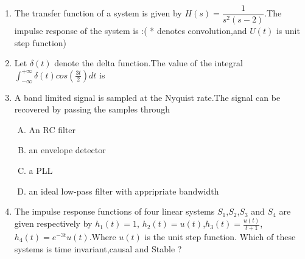 \documentclass[journal,12pt,twocolumn]{IEEEtran}
\begin{document}
\begin{enumerate}
\item The transfer function of a system is given by $H(s)=\dfrac{1}{s^{2}(s-2)}$.The impulse response of the system is :( * denotes convolution,and $U(t)$ is unit step function)

\begin{enumerate}[(A)]
\end{enumerate}


\item Let $\delta(t)$ denote the delta function.The value of the integral $\int_{-\infty}^{+\infty} \delta(t) cos(\frac{3t}{2}) dt$ is\\

\begin{enumerate}[(A)]
\end{enumerate}


\item A band limited signal is sampled at the Nyquist rate.The signal can be recovered by passing the samples through\\

\begin{enumerate}[(A)]

\setlength\itemsep{2em}

\item An RC filter
\item an envelope detector
\item a PLL
\item an ideal low-pass filter with appripriate bandwidth


\end{enumerate}

\item The impulse response functions of four linear systems $S_1$,$S_2$,$S_3$ and $S_4$ are given respectively by
\newline $h_1(t)=1$, $h_2(t)=u(t)$,$h_3(t)=\frac{u(t)}{t+1}$, $h_4(t)=e^{-3t}u(t)$.Where $u(t)$ is the unit step function. Which of these systems is time invariant,causal and Stable ?
\begin{enumerate}[(A)]
\begin{multicols}{4}
\setlength\itemsep{2em}


\end{multicols}
\end{enumerate}
\end{enumerate}
\end{document}
